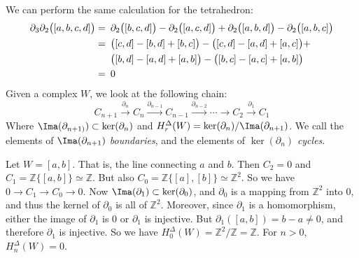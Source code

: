 \documentclass[crop=false,class=article,oneside]{standalone}
\begin{document}
            We can perform the same calculation for the tetrahedron:
            \begin{align*}
                \partial_{3}\partial_{2}\big([a,b,c,d]\big)
                =&\hspace{0.5em}\partial_{2}\big([b,c,d]\big)
                 -\partial_{2}\big([a,c,d]\big)
                 +\partial_{2}\big([a,b,d]\big)
                 -\partial_{2}\big([a,b,c]\big)\\
                =&\hspace{0.5em}\big([c,d]-[b,d]+[b,c]\big)
                 -\big([c,d]-[a,d]+[a,c]\big)+\\
                &\hspace{0.5em}\big([b,d]-[a,d]+[a,b]\big)
                 -\big([b,c]-[a,c]+[a,b]\big)\\
                =&\hspace{0.5em}0
            \end{align*}
            Given a complex $W$, we look at the following chain:
            \begin{equation*}
                C_{n+1}\overset{\partial_{n}}{\longrightarrow}
                C_{n}\overset{\partial_{n-1}}{\longrightarrow}
                C_{n-1}\overset{\partial_{n-2}}{\longrightarrow}
                \cdots\longrightarrow
                C_{2}\overset{\partial_{1}}{\longrightarrow}C_{1}
            \end{equation*}
            Where $\Ima(\partial_{n+1)})\subset\ker(\partial_{n})$
            and $H_{r}^{\Delta}(W)=\ker(\partial_{n})/\Ima(\partial_{n+1})$.
            We call the elements of $\Ima(\partial_{n+1})$
            \textit{boundaries}, and the elements of
            $\ker(\partial_{n})$ \textit{cycles}.
            \begin{example}
                Let $W=[a,b]$. That is, the line connecting
                $a$ and $b$. Then $C_{2}=0$ and
                $C_{1}=\mathbb{Z}\{[a,b]\}\simeq\mathbb{Z}$.
                But also
                $C_{0}=\mathbb{Z}\{[a],[b]\}\simeq\mathbb{Z}^{2}$.
                So we have
                $0\rightarrow{C_{1}}\rightarrow{C_{0}}\rightarrow0$.
                Now $\Ima(\partial_{1})\subset\ker(\partial_{0})$,
                and $\partial_{0}$ is a mapping from
                $\mathbb{Z}^{2}$ into $0$, and thus the kernel
                of $\partial_{0}$ is all of $\mathbb{Z}^{2}$.
                Moreover, since $\partial_{1}$ is a
                homomorphism, either the image of $\partial_{1}$
                is $0$ or $\partial_{1}$ is injective. But
                $\partial_{1}([a,b])=b-a\ne0$, and therefore
                $\partial_{1}$ is injective. So we have
                $H_{0}^{\Delta}(W)=\mathbb{Z}^{2}/\mathbb{Z}=\mathbb{Z}$.
                For $n>0$, $H_{n}^{\Delta}(W)=0$.
            \end{example}
\end{document}
